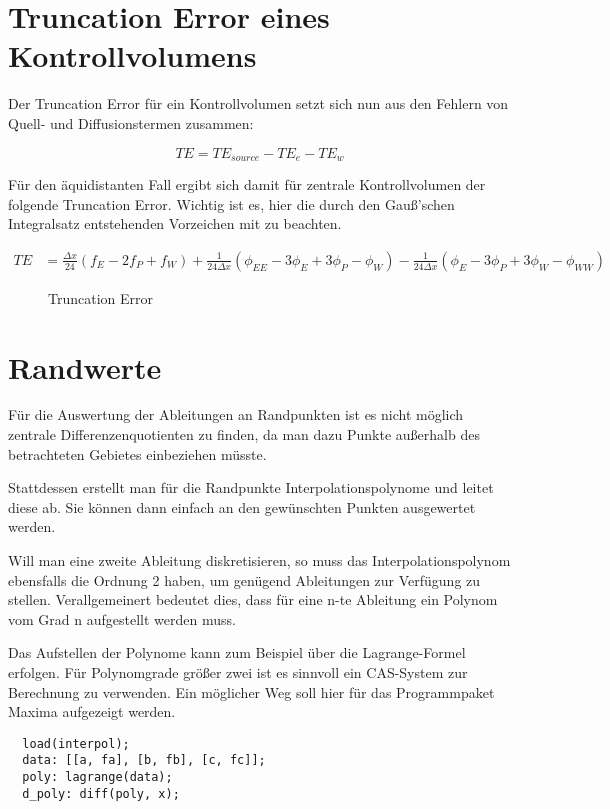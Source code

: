 \documentclass[10pt, ngerman,colorback,accentcolor=tud2d]{tudreport}
\begin{document}
\section{Truncation Error eines Kontrollvolumens}
\label{sec:Truncation Error eines Kontrollvolumens}

Der Truncation Error für ein Kontrollvolumen setzt sich nun aus den Fehlern von Quell-
und Diffusionstermen zusammen:

\begin{equation*}
  TE = TE_{source} - TE_e - TE_w
\end{equation*}

Für den äquidistanten Fall ergibt sich damit für zentrale Kontrollvolumen der folgende
Truncation Error. Wichtig ist es, hier die durch den Gauß'schen Integralsatz 
entstehenden Vorzeichen mit zu beachten.

\begin{align}
  TE &= \frac{\Delta x}{24} \left({f_E-2f_P+f_W}\right)
   +\frac{1}{24\Delta x}\left({
\phi_{EE}-3\phi_E+3\phi_P-\phi_W}\right)
  -\frac{1}{24 \Delta x}\left({
\phi_E-3\phi_P+3\phi_W-\phi_{WW}}\right)
\end{align}

\begin{figure}[h]
\caption{Truncation Error}
\end{figure}

\section{Randwerte}
\label{sec:Randwerte}

Für die Auswertung der Ableitungen an Randpunkten ist es nicht möglich zentrale Differenzenquotienten
zu finden, da man dazu Punkte außerhalb des betrachteten Gebietes einbeziehen müsste.

Stattdessen erstellt man für die Randpunkte Interpolationspolynome und leitet diese ab.
Sie können dann einfach an den gewünschten Punkten ausgewertet werden.

Will man eine zweite Ableitung diskretisieren, so muss das Interpolationspolynom
ebensfalls die Ordnung 2 haben, um genügend Ableitungen zur Verfügung zu stellen.
Verallgemeinert bedeutet dies, dass für eine n-te Ableitung ein Polynom vom Grad n
aufgestellt werden muss.

Das Aufstellen der Polynome kann zum Beispiel über die Lagrange-Formel erfolgen.
Für Polynomgrade größer zwei ist es sinnvoll ein CAS-System zur Berechnung zu verwenden.
Ein möglicher Weg soll hier für das Programmpaket Maxima aufgezeigt werden.

\begin{lstlisting}
  load(interpol);
  data: [[a, fa], [b, fb], [c, fc]];
  poly: lagrange(data);
  d_poly: diff(poly, x);
  
\end{lstlisting}
\end{document}
